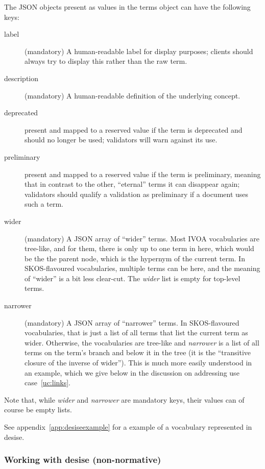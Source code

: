 \documentclass[11pt,a4paper]{ivoa}
\begin{document}
The JSON objects present as values in the terms object can have the
following keys:

\begin{description}
\item[label] (mandatory) 
A human-readable label for display purposes; clients should
always try to display this rather than the raw term.

\item[description] (mandatory) A human-readable definition of the underlying
concept.

\item[deprecated] present and mapped to a reserved value if the term is
deprecated and should no longer be used; validators will warn against
its use.

\item[preliminary] present and mapped to a reserved value if the term
is preliminary, meaning that in contrast to the other, ``eternal'' terms
it can disappear again; validators should qualify a validation as
preliminary if a document uses such a term.

\item[wider] (mandatory) A JSON array
of ``wider'' terms.  Most IVOA vocabularies are
tree-like, and for them, there is only up to one term in here, which
would be the the parent node, which is the hypernym of the current term.
In SKOS-flavoured vocabularies, multiple terms can be here, and the
meaning of ``wider'' is a bit less clear-cut.  The \textit{wider} list
is empty for top-level terms.

\item[narrower] (mandatory) A JSON array
of ``narrower'' terms.  In SKOS-flavoured
vocabularies, that is just a list of all terms that list the current
term as wider.  Otherwise, the vocabularies are tree-like and
\textit{narrower} is a list of all terms on the term's branch and below
it in the tree (it is the ``transitive closure of the inverse of
wider'').  This is much more easily understood in an example, which we
give below in the discussion on addressing use case~\ref{uc:links}.
\end{description}

Note that, while \textit{wider} and \textit{narrower} are mandatory
keys, their values can of course be empty lists.

See appendix~\ref{app:desiseexample} for a example of a vocabulary
represented in desise.

\subsubsection{Working with desise (non-normative)}
\end{document}
